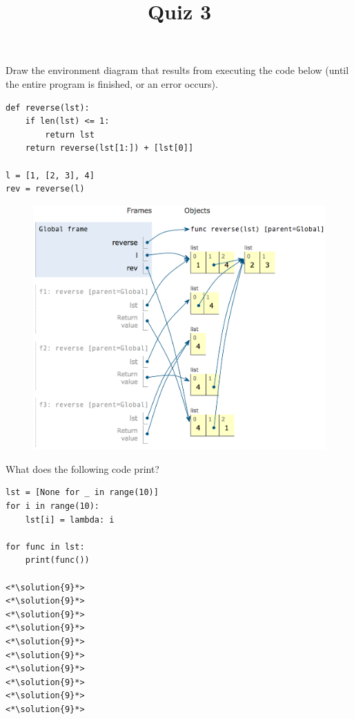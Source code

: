 \documentclass[twoside]{article}
\title{\sc Quiz 3 \solution{Solutions}}
\newcommand{\solution}[1]{{\color{red}#1}}
\begin{document}
\maketitle

\begin{enumerate}

Draw the environment diagram that results from executing the code below (until the entire program is finished, or an error occurs).
\vspace{0.1in}

\begin{lstlisting}
def reverse(lst):
    if len(lst) <= 1:
        return lst
    return reverse(lst[1:]) + [lst[0]]

l = [1, [2, 3], 4]
rev = reverse(l)
\end{lstlisting}

\begin{figure}[ht!]
\hspace*{5mm}
\includegraphics[width=155mm]{../../../../images/quiz3_sol.png}
\end{figure}

\newpage


What does the following code print?
\vspace{0.1in}

\begin{lstlisting}
lst = [None for _ in range(10)]
for i in range(10):
    lst[i] = lambda: i

for func in lst:
    print(func())

<*\solution{9}*>
<*\solution{9}*>
<*\solution{9}*>
<*\solution{9}*>
<*\solution{9}*>
<*\solution{9}*>
<*\solution{9}*>
<*\solution{9}*>
<*\solution{9}*>
<*\solution{9}*>
\end{lstlisting}

\end{enumerate}
\end{document}
